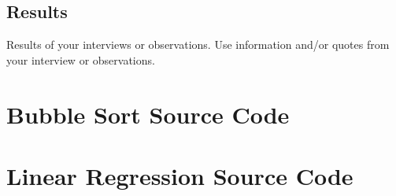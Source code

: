 \documentclass[10pt, twocolumn]{report}
\begin{document}
\section{Results}
Results of your interviews or observations. Use information and/or quotes from your interview or observations.

\begin{appendices}
	\chapter{Bubble Sort Source Code}
	
	
	

	\chapter{Linear Regression Source Code}
	
	
	
\end{appendices}
\end{document}
